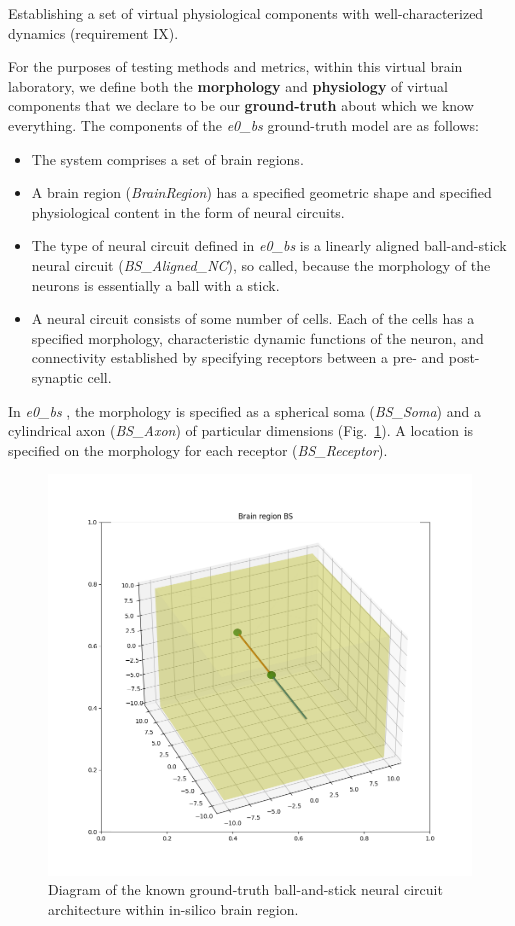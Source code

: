 \documentclass{ldr-article}
\def\firstexp{\textit{e0\_bs} }
\begin{document}
Establishing a set of virtual physiological components with well-characterized dynamics (requirement IX).

For the purposes of testing methods and metrics, within this virtual brain laboratory, we define both the \textbf{morphology} and \textbf{physiology} of virtual components that we declare to be our \textbf{ground-truth} about which we know everything. The components of the \firstexp ground-truth model are as follows:

\begin{itemize}
	\item The system comprises a set of brain regions.
	\item A brain region (\textit{BrainRegion}) has a specified geometric shape and specified physiological content in the form of neural circuits.
	\item The type of neural circuit defined in \firstexp is a linearly aligned ball-and-stick neural circuit (\textit{BS\_Aligned\_NC}), so called, because the morphology of the neurons is essentially a ball with a stick.
	\item A neural circuit consists of some number of cells. Each of the cells has a specified morphology, characteristic dynamic functions of the neuron, and connectivity established by specifying receptors between a pre- and post-synaptic cell.
\end{itemize}

In \firstexp, the morphology is specified as a spherical soma (\textit{BS\_Soma}) and a cylindrical axon (\textit{BS\_Axon}) of particular dimensions (Fig.~\ref{fig:KGT-architecture}). A location is specified on the morphology for each receptor (\textit{BS\_Receptor}).

\begin{figure}
	\centering
	\includegraphics[width=1\linewidth]{figures/e0_bs.png}
	\caption{Diagram of the known ground-truth ball-and-stick neural circuit architecture within in-silico brain region.
	}
	\label{fig:KGT-architecture}
\end{figure}
\end{document}
